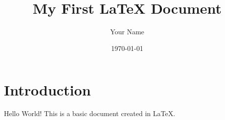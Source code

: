 \documentclass{article}
\title{My First LaTeX Document}
\author{Your Name}
\date{\today}
\begin{document}
\maketitle

\section{Introduction}
Hello World! This is a basic document created in \LaTeX.
\end{document}
